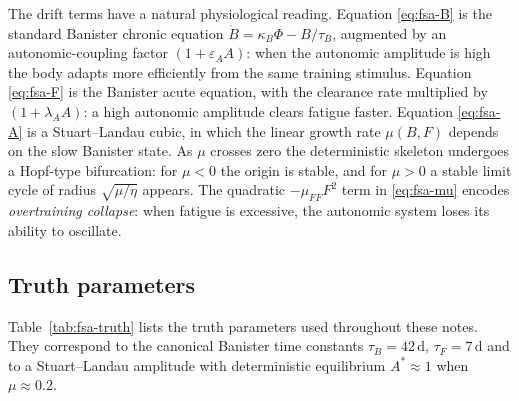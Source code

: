 The drift terms have a natural physiological reading. Equation
\eqref{eq:fsa-B} is the standard Banister chronic equation
$\dot B = \kappa_B \Phi - B/\tau_B$, augmented by an autonomic-coupling
factor $(1+\varepsilon_A A)$: when the autonomic amplitude is high the
body adapts more efficiently from the same training stimulus. Equation
\eqref{eq:fsa-F} is the Banister acute equation, with the clearance rate
multiplied by $(1+\lambda_A A)$: a high autonomic amplitude clears fatigue
faster. Equation \eqref{eq:fsa-A} is a Stuart--Landau cubic, in which the
linear growth rate $\mu(B,F)$ depends on the slow Banister state. As
$\mu$ crosses zero the deterministic skeleton undergoes a Hopf-type
bifurcation: for $\mu<0$ the origin is stable, and for $\mu>0$ a stable
limit cycle of radius $\sqrt{\mu/\eta}$ appears. The quadratic
$-\mu_{FF} F^2$ term in \eqref{eq:fsa-mu} encodes \emph{overtraining
collapse}: when fatigue is excessive, the autonomic system loses its
ability to oscillate.

\subsection{Truth parameters}

Table~\ref{tab:fsa-truth} lists the truth parameters used throughout
these notes. They correspond to the canonical Banister time constants
$\tau_B = 42\,\mathrm{d}$, $\tau_F = 7\,\mathrm{d}$ and to a Stuart--Landau
amplitude with deterministic equilibrium $A^* \approx 1$ when
$\mu \approx 0.2$.

